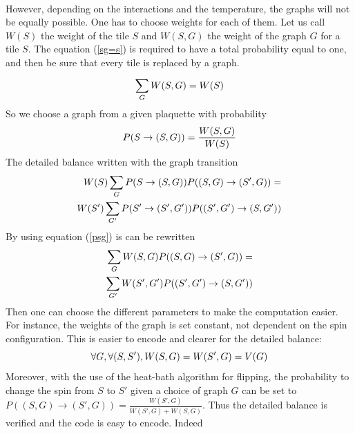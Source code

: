 \documentclass[a4paper,12pt]{article}
\begin{document}
	\paragraph{}
	However, depending on the interactions and the temperature, the graphs will not be equally possible. One has to choose weights for each of them. Let us call $W(S)$ the weight of the tile $S$ and $W(S,G)$ the weight of the graph $G$ for a tile $S$. The equation (\ref{sg=s}) is required to have a total probability equal to one, and then be sure that every tile is replaced by a graph.
	\begin{equation}
		\centering
		\label{sg=s}
		\sum_{G}^{} W(S,G) = W(S)
	\end{equation}
	So we choose a graph from a given plaquette with probability
	\begin{equation}
		\centering
		P(S\rightarrow(S, G)) = \frac{W(S,G)}{W(S)}
		\label{psg}
	\end{equation}
	The detailed balance written with the graph transition
	\begin{equation}
		\begin{split}
			W(S)\sum_{G}P(S\rightarrow (S,G))P((S,G)\rightarrow(S',G))
			= \\ W(S') \sum_{G'} P(S'\rightarrow (S',G'))P((S',G')\rightarrow(S,G'))
		\end{split}
		\centering
	\end{equation}
	By using equation (\ref{psg}) is can be rewritten
	\begin{equation}
		\begin{split}
		\sum_{G}W(S,G)P((S,G)\rightarrow(S',G)) = \\ \sum_{G'}W(S',G')P((S',G')\rightarrow(S,G'))
		\end{split}
		\centering
	\end{equation}
	Then one can choose the different parameters to make the computation easier. For instance, the weights of the graph is set constant, not dependent on the spin configuration. This is easier to encode and clearer for the detailed balance:
	\begin{equation}
		\centering
		\forall G, \forall(S,S'), W(S,G) = W(S',G) = V(G) \label{indepG}
	\end{equation}
	 Moreover, with the use of the heat-bath algorithm for flipping, the probability to change the spin from $S$ to $S'$ given a choice of graph $G$ can be set to $P((S,G)\rightarrow(S',G)) = \frac{W(S',G)}{W(S',G) + W(S,G)}$. Thus the detailed balance is verified and the code is easy to encode. Indeed
\end{document}
